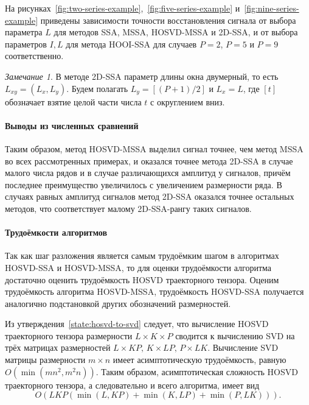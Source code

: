 \documentclass[specialist,
    substylefile = spbu.rtx,
    subf,href,colorlinks=true, 12pt]{disser}
\theoremstyle{plain}
\theoremstyle{definition}
\theoremstyle{remark}
\newtheorem*{remark}{Замечание}
\begin{document}
    На рисунках~\ref{fig:two-series-example},~\ref{fig:five-series-example} и~\ref{fig:nine-series-example}
    приведены зависимости точности восстановления
    сигнала от выбора параметра $L$ для методов SSA, MSSA, HOSVD-MSSA и 2D-SSA, и от
    выбора параметров $I, L$ для метода HOOI-SSA
    для случаев $P=2$, $P=5$ и $P=9$
    соответственно.

    \begin{remark}
        В методе 2D-SSA параметр длины окна двумерный, то есть $L_{xy}=(L_x, L_y)$.
        Будем полагать $L_y = [(P + 1) / 2]$ и $L_x=L$, где $[t]$ обозначает взятие
        целой части числа $t$ с округлением вниз.
    \end{remark}

    \paragraph{Выводы из численных сравнений}\label{par:numerical-comparison-res}
    Таким образом, метод HOSVD-MSSA выделил сигнал точнее, чем метод MSSA во всех рассмотренных примерах, и
    оказался точнее метода 2D-SSA в случае малого числа рядов и в случае различающихся
    амплитуд у сигналов, причём последнее преимущество увеличилось с увеличением размерности ряда.
    В случаях равных амплитуд сигналов метод 2D-SSA оказался точнее остальных методов,
    что соответствует малому 2D-SSA-рангу таких сигналов.

    \paragraph{Трудоёмкости алгоритмов}\label{par:alg-complexity}
    Так как шаг разложения является самым трудоёмким шагом в алгоритмах HOSVD-SSA и HOSVD-MSSA,
    то для оценки трудоёмкости алгоритма достаточно оценить трудоёмкость HOSVD траекторного тензора.
    Оценим трудоёмкость алгоритма HOSVD-MSSA, трудоёмкость HOSVD-SSA получается аналогично подстановкой
    других обозначений размерностей.

    Из утверждения~\ref{state:hosvd-to-svd} следует, что вычисление HOSVD траекторного тензора размерности ${L\times K \times P}$
    сводится к вычислению SVD на трёх матрицах размерностей \linebreak $L\times KP,\, K\times LP,\, P\times LK$.
    Вычисление SVD матрицы размерности $m\times n$ имеет асимптотическую трудоёмкость, равную $O(\min(mn^2, m^2 n)).$
    Таким образом, асимптотическая сложность HOSVD траекторного тензора, а следовательно и всего алгоритма, имеет вид
    \begin{equation}
        \label{eq:hosvd-mssa-complexity}
        O\left(LKP(\min(L, KP) + \min(K, LP) + \min(P, LK))\right).
    \end{equation}
\end{document}
